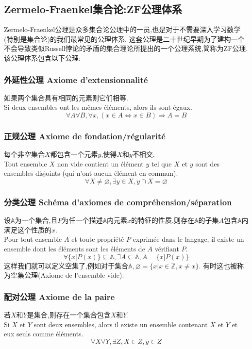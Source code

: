 \documentclass[12pt, a4paper, oneside]{ctexbook}
\begin{document}
  \subsection{Zermelo-Fraenkel集合论:ZF公理体系}
  Zermelo-Fraenkel公理是众多集合论公理中的一员,也是对于不需要深入学习数学(特别是集合论)的我们最常见的公理体系.
  这套公理是二十世纪早期为了建构一个不会导致类似Russell悖论的矛盾的集合理论所提出的一个公理系统,简称为ZF公理.
  该公理体系包含以下公理:

    \subsubsection{外延性公理 Axiome d'extensionnalité}
      如果两个集合具有相同的元素则它们相等.\\\indent
      Si deux ensembles ont les mêmes éléments, alors ils sont égaux.
      $$
        \forall A\forall B,\forall x,(x\in A\Leftrightarrow x\in B)\Rightarrow A=B 
      $$

      \subsubsection{正规公理 Axiome de fondation/régularité}
      每个非空集合$X$都包含一个元素$y$,使得$X$和$y$不相交.\\\indent
      Tout ensemble $X$ non vide contient un élément $y$ tel que $X$ et $y$ sont des ensembles disjoints (qui n'ont aucun élément en commun).
      $$
        \forall X\neq \varnothing ,\exists y\in X,y\cap X=\varnothing 
      $$

      \subsubsection{分类公理 Schéma d'axiomes de compréhension/séparation}
      设$\mathbb{A}$为一个集合,且$P$为任一个描述$\mathbb{A}$内元素$x$的特征的性质,则存在$\mathbb{A}$的子集$A$包含$\mathbb{A}$内满足这个性质的$x$.\\\indent
      Pour tout ensemble $A$ et toute propriété $P$ exprimée dans le langage, il existe un ensemble dont les éléments sont les éléments de $A$ vérifiant $P$.
      $$
      \forall \{x| P(x) \}\subseteq \mathbb{A},\exists A\subseteq \mathbb{A},A=\{x| P(x)\}
      $$
      这样我们就可以定义空集了,例如对于集合$\mathbb{A},\varnothing =\{x|x\in\mathbb{Z}, x\neq x\}$.
      有时这也被称为空集公理(Axiome de l'ensemble vide).


      \subsubsection{配对公理 Axiome de la paire}
      若$X$和$Y$是集合,则存在一个集合包含$X$和$Y$. \\\indent
      Si $X$ et $Y$ sont deux ensembles, alors il existe un ensemble contenant $X$ et $Y$ et eux seuls comme éléments.
      $$
      \forall X\forall Y, \exists Z,X\in Z,y\in Z 
      $$
\end{document}
